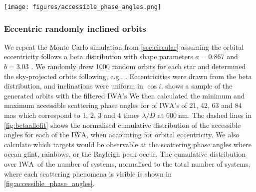 \documentclass[
    usenatbib,
]{mnras}
\newcommand{\todo}[1]{\textcolor{red}{[#1]}}
\newcommand{\IWA}{\ensuremath{\mathrm{IWA}}}
\begin{document}
\begin{figure*}[t]
    \centering
    \texttt{[image: figures/accessible\_phase\_angles.png]}  
    \caption{
        \todo{shouldn't lambda/D for 600nm give 21, 41, 62, 83 mas?} 
        Cumulative distributions of the most extreme scattering phase angle accessible for different \IWA where the solid lines are for randomly inclined circular orbits and the dashed lines are for randomly orientated elliptical orbits. The top x axis indicates the minimum scattering phase angle and the bottom x axis indicates the maximum. These are symmetric about quadrature (90 degrees) \todo{is this true for elliptical orbits?}. The y axis indicates the number of systems divided by the number of Monte Carlo samples and is thus normalised to the number of systems in the target list. The secondary y axis indicates the number of systems assuming only 24 percent of them contain an Earth-like exoplanet in the habitable zone.
    }
    \label{fig:betaallofit}
\end{figure*}

\subsubsection{Eccentric randomly inclined orbits}
\label{sec:eccentric}
We repeat the Monte Carlo simulation from \cref{sec:circular} assuming the orbital eccentricity follows a beta distribution with shape parameters $a=0.867$ and $b=3.03$ \citep{2013MNRAS.434L..51K}. 
%
We randomly drew 1000 random orbits for each star and determined the sky-projected orbits following, e.g., \cite{2010exop.book...15M}. Eccentricities were drawn from the beta distribution, and inclinations were uniform in $\cos i$.  shows a sample of the generated orbits with the filtered \IWA's
%
%
We then calculated the minimum and maximum accessible scattering phase angles for of \IWA's of 21, 42, 63 and 84 mas which correspond to 1, 2, 3 and 4 times $\lambda / D$ at $\SI{600}{\nano\meter}$. The dashed lines in \cref{fig:betaallofit} shows the normalised cumulative distribution of the accessible angles for each of the \IWA, when accounting for orbital eccentricity.
%
We also calculate which targets would be observable at the scattering phase angles where ocean glint, rainbows, or the Rayleigh peak occur. The cumulative distribution over \IWA\ of the number of systems, normalised to the total number of systems, where each scattering phenomena is visible is shown in \cref{fig:accessible_phase_angles}.
%
 
\end{document}
